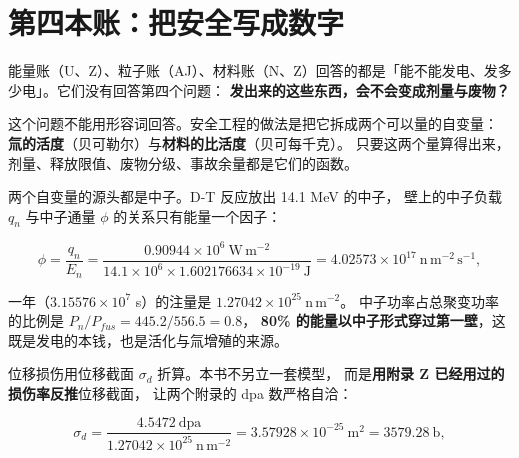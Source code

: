 
\section{第四本账：把安全写成数字}
\label{sec:app-ak-frame}

能量账（U、Z）、粒子账（AJ）、材料账（N、Z）回答的都是「能不能发电、发多少电」。它们没有回答第四个问题：
\textbf{发出来的这些东西，会不会变成剂量与废物？}

这个问题不能用形容词回答。安全工程的做法是把它拆成两个可以量的自变量：
\textbf{氚的活度}（贝可勒尔）与\textbf{材料的比活度}（贝可每千克）。
只要这两个量算得出来，剂量、释放限值、废物分级、事故余量都是它们的函数。

两个自变量的源头都是中子。D-T 反应放出 14.1 MeV 的中子，
壁上的中子负载 $q_n$ 与中子通量 $\phi$ 的关系只有能量一个因子：

\begin{equation}
\phi=\frac{q_n}{E_n}
=\frac{0.90944\times10^{6}\ \mathrm{W\,m^{-2}}}{14.1\times10^{6}\times1.602176634\times10^{-19}\ \mathrm{J}}
=4.02573\times10^{17}\ \mathrm{n\,m^{-2}\,s^{-1}},
\label{eq:app-ak-flux}
\end{equation}

一年（$3.15576\times10^{7}$ s）的注量是 $1.27042\times10^{25}\ \mathrm{n\,m^{-2}}$。
中子功率占总聚变功率的比例是 $P_n/P_{fus}=445.2/556.5=0.8$，
\textbf{80\% 的能量以中子形式穿过第一壁}，这既是发电的本钱，也是活化与氚增殖的来源。

位移损伤用位移截面 $\sigma_d$ 折算。本书不另立一套模型，
而是\textbf{用附录 Z 已经用过的损伤率反推}位移截面，
让两个附录的 dpa 数严格自洽：

\begin{equation}
\sigma_d=\frac{4.5472\ \mathrm{dpa}}{1.27042\times10^{25}\ \mathrm{n\,m^{-2}}}
=3.57928\times10^{-25}\ \mathrm{m^{2}}=3579.28\ \mathrm{b},
\label{eq:app-ak-dpa}
\end{equation}

